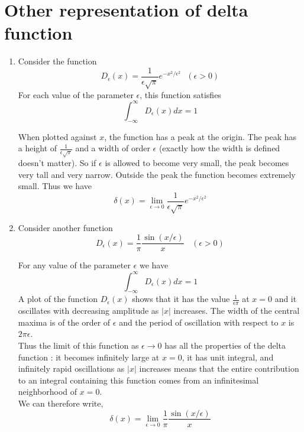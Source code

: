 	\section{Other representation of delta function}
		\begin{enumerate}
			\item 
			Consider the function
			\begin{equation}
				D_\epsilon(x) = \frac{1}{\epsilon \sqrt{\pi}} e^{-x^2/\epsilon^2}  \ \ \ (\epsilon > 0)
			\end{equation}
			For each value of the parameter $\epsilon$, this function satisfies
			\begin{equation}
			\int_{-\infty}^{\infty} D_\epsilon(x) dx = 1
			\end{equation}
		
		
		
		When plotted against $x$, the function has a peak at the origin. The peak has a height of $\frac{1}{\epsilon \sqrt{\pi}}$ and a width of order $\epsilon$ (exactly how the width is defined doesn't matter). So if $\epsilon$ is allowed to become very small, the peak becomes very tall and very narrow. Outside the peak the function becomes extremely small. Thus we have
		\begin{equation}
		\delta(x) = \lim\limits_{\epsilon \rightarrow 0}\frac{1}{\epsilon \sqrt{\pi}} e^{-x^2/\epsilon^2}
		\end{equation}
		
		
		\item
		Consider another function
		\begin{equation}
			D_\epsilon(x) = \frac{1}{\pi} \frac{\sin(x/\epsilon)}{x} \ \ \ \ (\epsilon > 0)
		\end{equation} 
		
		
		For any value of the parameter $\epsilon$ we have 
		\begin{equation}
			\int_{-\infty}^{\infty} D_\epsilon(x) dx = 1
		\end{equation}
		A plot of the function $D_\epsilon(x)$ shows that it has the value $\frac{1}{\epsilon \pi}$ at $x=0$ and it oscillates with decreasing amplitude as $|x|$ increases. The width of the central maxima is of the order of $\epsilon$ and the period of oscillation with respect to $x$ is $2 \pi \epsilon$.\\
		Thus the limit of this function as $\epsilon \rightarrow 0 $ has all the properties of the delta function : it becomes infinitely large at $x=0$, it has unit integral, and infinitely rapid oscillations as $|x|$ increases means that the entire contribution to an integral containing this function comes from an infinitesimal neighborhood of $x=0$.\\
		We can therefore write,
		\begin{equation}
			\delta(x) = \lim\limits_{\epsilon \rightarrow 0} \frac{1}{\pi} \frac{\sin(x/\epsilon)}{x}
		\end{equation}


\end{enumerate}
